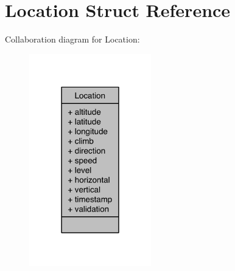 \section{Location Struct Reference}
\label{structLocation}


Collaboration diagram for Location\-:\nopagebreak
\begin{figure}[H]
\begin{center}
\leavevmode
\includegraphics[width=150pt]{structLocation__coll__graph}
\end{center}
\end{figure}
